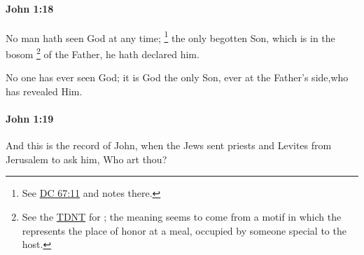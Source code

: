 		\paragraph{John 1:18} %
			\label{JOHN-1-18}

			No man hath seen God at any time;%
				\footnote{%
					See \hyperref[DC67-11]{DC 67:11} and notes there.
					} 
			the only begotten Son, which is in the bosom%
				\footnote{%
					See the \hyperref[KOLPOS-TDNT]{TDNT} for ; the meaning seems to come from a motif in which the  represents the place of honor at a meal, occupied by someone special to the host.
					}
			of the Father, he hath declared him.

			\begin{framed}
			\scriptsize
				\begin{compactdesc}
					\item[SBLG]  \hyperref[KOLPOS]{} 
					\item[AB 4] No one has ever seen God; it is God the only Son, ever at the Father's side,\footnotemark who has revealed Him.
				\end{compactdesc}
			\end{framed}

		\paragraph{John 1:19} %
			\label{JOHN-1-19}

			And this is the record of John, when the Jews sent priests and Levites from Jerusalem to ask him, Who art thou?

